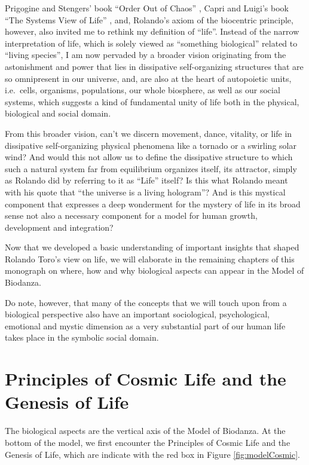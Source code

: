 \documentclass[
  11pt,
]{book}
\begin{document}
Prigogine and Stengers' book ``Order Out of Chaos'' \citep{prigogineStengers1984}, Capri and Luigi's book ``The Systems View of Life'' \citep{capraLuisi2014}, and, Rolando's axiom of the biocentric principle, however, also invited me to rethink my definition of ``life''. Instead of the narrow interpretation of life, which is solely viewed as ``something biological'' related to ``living species'', I am now pervaded by a broader vision originating from the astonishment and power that lies in dissipative self-organizing structures that are so omnipresent in our universe, and, are also at the heart of autopoietic units, i.e.~cells, organisms, populations, our whole biosphere, as well as our social systems, which suggests a kind of fundamental unity of life both in the physical, biological and social domain.

From this broader vision, can't we discern movement, dance, vitality, or life in dissipative self-organizing physical phenomena like a tornado or a swirling solar wind? And would this not allow us to define the dissipative structure to which such a natural system far from equilibrium organizes itself, its attractor, simply as Rolando did by referring to it as ``Life'' itself? Is this what Rolando meant with his quote that ``the universe is a living hologram''? And is this mystical component that expresses a deep wonderment for the mystery of life in its broad sense not also a necessary component for a model for human growth, development and integration?

Now that we developed a basic understanding of important insights that shaped Rolando Toro's view on life, we will elaborate in the remaining chapters of this monograph on where, how and why biological aspects can appear in the Model of Biodanza.

Do note, however, that many of the concepts that we will touch upon from a biological perspective also have an important sociological, psychological, emotional and mystic dimension as a very substantial part of our human life takes place in the symbolic social domain.

\hypertarget{principles-of-cosmic-life-and-the-genesis-of-life}{%
\chapter{Principles of Cosmic Life and the Genesis of Life}\label{principles-of-cosmic-life-and-the-genesis-of-life}}

The biological aspects are the vertical axis of the Model of Biodanza.
At the bottom of the model, we first encounter the Principles of Cosmic Life and the Genesis of Life, which are indicate with the red box in Figure \ref{fig:modelCosmic}.
\end{document}
